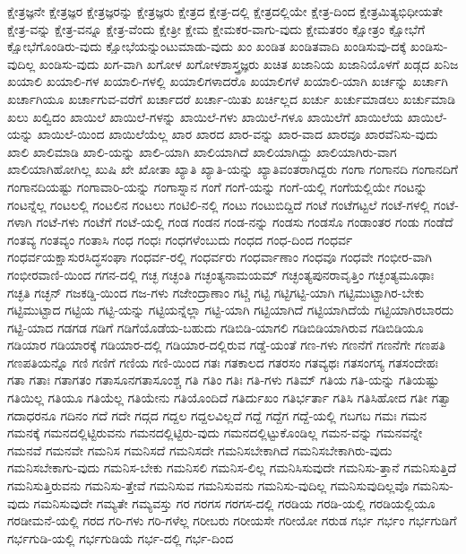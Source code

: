 {ಕ್ಷೇತ್ರಜ್ಞನೇ
ಕ್ಷೇತ್ರಜ್ಞರ
ಕ್ಷೇತ್ರಜ್ಞರನ್ನು
ಕ್ಷೇತ್ರಜ್ಞರು
ಕ್ಷೇತ್ರದ
ಕ್ಷೇತ್ರ-ದಲ್ಲಿ
ಕ್ಷೇತ್ರದಲ್ಲಿಯೇ
ಕ್ಷೇತ್ರ-ದಿಂದ
ಕ್ಷೇತ್ರಮಿತ್ಯಭಿಧೀಯತೇ
ಕ್ಷೇತ್ರ-ವನ್ನು
ಕ್ಷೇತ್ರ-ವನ್ನೂ
ಕ್ಷೇತ್ರ-ವೆಂದು
ಕ್ಷೇತ್ರೀ
ಕ್ಷೇಮ
ಕ್ಷೇಮಕರ-ವಾಗು-ವುದು
ಕ್ಷೇಮತರಂ
ಕ್ಷೋತ್ರಂ
ಕ್ಷೋಭೆಗೆ
ಕ್ಷೋಭೆಗೊಂಡಿರು-ವುದು
ಕ್ಷೋಭೆಯನ್ನುಂಟುಮಾಡು-ವುದು
ಖಂ
ಖಂಡಿತ
ಖಂಡಿತವಾದಿ
ಖಂಡಿಸುವು-ದಕ್ಕೆ
ಖಂಡಿಸು-ವುದಿಲ್ಲ
ಖಂಡಿಸು-ವುದು
ಖಗ-ವಾಗಿ
ಖಗೋಳ
ಖಗೋಳಶಾಸ್ತ್ರಜ್ಞರು
ಖಚಿತ
ಖಜಾನಿಯ
ಖಜಾನಿಯೊಳಗೆ
ಖಡ್ಗದ
ಖನಿಜ
ಖಯಾಲಿ
ಖಯಾಲಿ-ಗಳ
ಖಯಾಲಿ-ಗಳಲ್ಲಿ
ಖಯಾಲಿಗಳಾದರೊ
ಖಯಾಲಿಗಳೆ
ಖಯಾಲಿ-ಯಾಗಿ
ಖರ್ಚನ್ನು
ಖರ್ಚಾಗಿ
ಖರ್ಚಾಗಿಯೂ
ಖರ್ಚಾಗುವ-ವರೆಗೆ
ಖರ್ಚಾದರೆ
ಖರ್ಚಾ-ಯಿತು
ಖರ್ಚಿಲ್ಲದ
ಖರ್ಚು
ಖರ್ಚುಮಾಡಲು
ಖರ್ಚುಮಾಡಿ
ಖಲು
ಖಲ್ವಿದಂ
ಖಾಯಿಲೆ
ಖಾಯಿಲೆ-ಗಳನ್ನು
ಖಾಯಿಲೆ-ಗಳು
ಖಾಯಿಲೆ-ಗಳೂ
ಖಾಯಿಲೆಗೆ
ಖಾಯಿಲೆಯ
ಖಾಯಿಲೆ-ಯನ್ನು
ಖಾಯಿಲೆ-ಯಿಂದ
ಖಾಯಿಲೆಯೆಲ್ಲ
ಖಾರ
ಖಾರದ
ಖಾರ-ವನ್ನು
ಖಾರ-ವಾದ
ಖಾರವೂ
ಖಾರವೆನಿಸು-ವುದು
ಖಾಲಿ
ಖಾಲಿಮಾಡಿ
ಖಾಲಿ-ಯನ್ನು
ಖಾಲಿ-ಯಾಗಿ
ಖಾಲಿಯಾಗಿದೆ
ಖಾಲಿಯಾಗಿದ್ದು
ಖಾಲಿಯಾಗಿರು-ವಾಗ
ಖಾಲಿಯಾಗಿಹೋಗಿಲ್ಲ
ಖುಷಿ
ಖೇ
ಖೋತಾ
ಖ್ಯಾತಿ
ಖ್ಯಾತಿ-ಯನ್ನು
ಖ್ಯಾತಿವಂತರಾಗಿದ್ದರು
ಗಂಗಾ
ಗಂಗಾನದಿ
ಗಂಗಾನದಿಗೆ
ಗಂಗಾನದಿಯಷ್ಟು
ಗಂಗಾವಾರಿ-ಯನ್ನು
ಗಂಗಾಸ್ನಾನ
ಗಂಗೆ
ಗಂಗೆ-ಯನ್ನು
ಗಂಗೆ-ಯಲ್ಲಿ
ಗಂಗೆಯಲ್ಲಿಯೇ
ಗಂಟನ್ನು
ಗಂಟನ್ನೆಲ್ಲ
ಗಂಟಲಲ್ಲಿ
ಗಂಟಲಿನ
ಗಂಟಲು
ಗಂಟಿಲಿ-ನಲ್ಲಿ
ಗಂಟು
ಗಂಟುಬಿದ್ದಿದೆ
ಗಂಟೆ
ಗಂಟೆಗಟ್ಟಲೆ
ಗಂಟೆ-ಗಳಲ್ಲಿ
ಗಂಟೆ-ಗಳಾಗಿ
ಗಂಟೆ-ಗಳು
ಗಂಟೆಗೆ
ಗಂಟೆ-ಯಲ್ಲಿ
ಗಂಡ
ಗಂಡನ
ಗಂಡ-ನನ್ನು
ಗಂಡಸು
ಗಂಡಸೊ
ಗಂಡಾಂತರ
ಗಂಡು
ಗಂಡೆದೆ
ಗಂತವ್ಯ
ಗಂತವ್ಯಂ
ಗಂತಾಸಿ
ಗಂಧ
ಗಂಧಃ
ಗಂಧಗಳೆಂಬುದು
ಗಂಧದ
ಗಂಧ-ದಿಂದ
ಗಂಧರ್ವ
ಗಂಧರ್ವಯಕ್ಷಾಸುರಸಿದ್ಧಸಂಘಾ
ಗಂಧರ್ವ-ರಲ್ಲಿ
ಗಂಧರ್ವರು
ಗಂಧರ್ವಾಣಾಂ
ಗಂಧವೂ
ಗಂಧವೇ
ಗಂಭೀರ-ವಾಗಿ
ಗಂಭೀರವಾಣಿ-ಯಿಂದ
ಗಗನ-ದಲ್ಲಿ
ಗಚ್ಛ
ಗಚ್ಛಂತಿ
ಗಚ್ಛಂತ್ಯನಾಮಯಮ್
ಗಚ್ಛಂತ್ಯಪುನರಾವೃತ್ತಿಂ
ಗಚ್ಛಂತ್ಯಮೂಢಾಃ
ಗಚ್ಛತಿ
ಗಚ್ಛನ್
ಗಜಕಡ್ಡಿ-ಯಿಂದ
ಗಜ-ಗಳು
ಗಜೇಂದ್ರಾಣಾಂ
ಗಟ್ಚಿ
ಗಟ್ಟಿ
ಗಟ್ಟಿಗಟ್ಟಿ-ಯಾಗಿ
ಗಟ್ಟಿಮುಟ್ಟಾಗಿರ-ಬೇಕು
ಗಟ್ಟಿಮುಟ್ಟಾದ
ಗಟ್ಟಿಯ
ಗಟ್ಟಿ-ಯನ್ನು
ಗಟ್ಟಿಯನ್ನೆಲ್ಲಾ
ಗಟ್ಟಿ-ಯಾಗಿ
ಗಟ್ಟಿಯಾಗಿದೆ
ಗಟ್ಟಿಯಾಗಿದೆಯೆ
ಗಟ್ಟಿಯಾಗಿರಬಾರದು
ಗಟ್ಟಿ-ಯಾದ
ಗಡಗಡ
ಗಡಿಗೆ
ಗಡಿಗೆಯೊಡೆಯ-ಬಹುದು
ಗಡಿಬಿಡಿ-ಯಾಗಲಿ
ಗಡಿಬಿಡಿಯಾಗಿರುವ
ಗಡಿಬಿಡಿಯೂ
ಗಡಿಯಾರ
ಗಡಿಯಾರಕ್ಕೆ
ಗಡಿಯಾರ-ದಲ್ಲಿ
ಗಡಿಯಾರ-ದಲ್ಲಿರುವ
ಗಡ್ಡೆ-ಯಂತೆ
ಗಣ-ಗಳು
ಗಣನೆಗೆ
ಗಣನೆಗೇ
ಗಣಪತಿ
ಗಣಪತಿಯನ್ನೊ
ಗಣಿ
ಗಣಿಗೆ
ಗಣಿಯ
ಗಣಿ-ಯಿಂದ
ಗತಃ
ಗತಕಾಲದ
ಗತರಸಂ
ಗತವ್ಯಥಃ
ಗತಸಂಗಸ್ಯ
ಗತಸಂದೇಹಃ
ಗತಾ
ಗತಾಃ
ಗತಾಗತಂ
ಗತಾಸೂನಗತಾಸೂಂಶ್ಚ
ಗತಿ
ಗತಿಂ
ಗತಿಃ
ಗತಿ-ಗಳು
ಗತಿಮ್
ಗತಿಯ
ಗತಿ-ಯನ್ನು
ಗತಿಯಷ್ಟು
ಗತಿಯಿಲ್ಲ
ಗತಿಯೂ
ಗತಿಯೆಲ್ಲ
ಗತಿಯೇನು
ಗತಿಯೊಂದಿದೆ
ಗತಿರ್ದುಖಂ
ಗತಿರ್ಭರ್ತಾ
ಗತಿಸಿ
ಗತಿಸಿಹೋದ
ಗತೀ
ಗತ್ವಾ
ಗದಾಧರನೂ
ಗದಿನಂ
ಗದೆ
ಗದೇ
ಗದ್ಗದ
ಗದ್ದಲ
ಗದ್ದಲವಿಲ್ಲದೆ
ಗದ್ದೆ
ಗದ್ದೆಗ
ಗದ್ದೆ-ಯಲ್ಲಿ
ಗಬಗಬ
ಗಮಃ
ಗಮನ
ಗಮನಕ್ಕೆ
ಗಮನದಲ್ಲಿಟ್ಟಿರುವನು
ಗಮನದಲ್ಲಿಟ್ಟಿರು-ವುದು
ಗಮನದಲ್ಲಿಟ್ಟುಕೊಂಡಿಲ್ಲ
ಗಮನ-ವನ್ನು
ಗಮನವನ್ನೇ
ಗಮನವೆ
ಗಮನವೇ
ಗಮನಿಸ
ಗಮನಿಸದೆ
ಗಮನಿಸದೇ
ಗಮನಿಸಬೇಕಾಗಿದೆ
ಗಮನಿಸಬೇಕಾಗಿರು-ವುದು
ಗಮನಿಸಬೇಕಾಗು-ವುದು
ಗಮನಿಸ-ಬೇಕು
ಗಮನಿಸಲಿ
ಗಮನಿಸ-ಲಿಲ್ಲ
ಗಮನಿಸಿಸುವುದೇ
ಗಮನಿಸು-ತ್ತಾನೆ
ಗಮನಿಸುತ್ತಿದೆ
ಗಮನಿಸುತ್ತಿರುವನು
ಗಮನಿಸು-ತ್ತೇವೆ
ಗಮನಿಸುವ
ಗಮನಿಸುವನು
ಗಮನಿಸು-ವುದಿಲ್ಲ
ಗಮನಿಸುವುದಿಲ್ಲವೊ
ಗಮನಿಸು-ವುದು
ಗಮನಿಸುವುದೇ
ಗಮ್ಯತೇ
ಗಮ್ಯವಸ್ತು
ಗರ
ಗರಗಸ
ಗರಗಸ-ದಲ್ಲಿ
ಗರಡಿಯ
ಗರಡಿ-ಯಲ್ಲಿ
ಗರಡಿಯಲ್ಲಿಯೂ
ಗರಡೀಮನೆ-ಯಲ್ಲಿ
ಗರದ
ಗರಿ-ಗಳು
ಗರಿ-ಗಳೆಲ್ಲ
ಗರೀಬರು
ಗರೀಯಸೇ
ಗರೀಯೋ
ಗರುಡ
ಗರ್ಭ
ಗರ್ಭಂ
ಗರ್ಭಗುಡಿಗೆ
ಗರ್ಭಗುಡಿ-ಯಲ್ಲಿ
ಗರ್ಭಗುಡಿಯೆ
ಗರ್ಭ-ದಲ್ಲಿ
ಗರ್ಭ-ದಿಂದ
}
